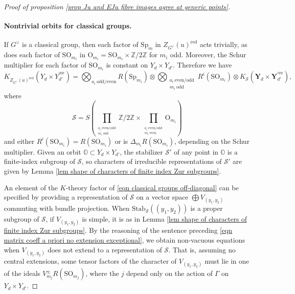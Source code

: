\documentclass[10pt]{article}
\newcommand{\stab}[2]{\mathrm{Stab}_{#1}(#2)}
\newcommand{\opp}{^\mathrm{opp}}
\newcommand{\Z}{\mathbb{Z}}
\newcommand{\SO}{\mathrm{SO}}
\newcommand{\Sp}{\mathrm{Sp}}
\newcommand{\OO}{\mathrm{O}}
\theoremstyle{definition}
\theoremstyle{remark}
\newcommand{\Zur}{Z_{G^\vee}(u)^{\mathrm{red}}}
\newcommand{\oO}{\mathbb{O}}
\begin{document}
\begin{proof}[Proof of proposition \ref{prop Ju and EJu fibre images agree at generic points}]
\paragraph{Nontrivial orbits for classical groups.}
If $G^\vee$ is a classical group,
then each factor of $\Sp_m$ in $\Zur$ acts trivially,
as does each factor of $\SO_{m_i}$ in $\OO_{m_i}=\SO_{m_i}\times\Z/2\Z$ for $m_i$ odd. Moreover, the Schur
multiplier for each factor of $\SO_{m_i}$ is constant on $Y_d\times Y_{d'}$. Therefore we have
%
\begin{equation}
\label{eqn classical groups off-diagonal}
K_{\Zur}(Y_d\times Y_{d'}^{\opp})=
\bigotimes_{a_i~\text{odd/even}}R(\Sp_{m_i})\otimes\bigotimes_{\substack{a_i~\text{even/odd} \\ m_i~\text{odd}}}R^i(\SO_{m_i})\otimes
K_{\mathcal{S}}(\mathbf{Y}_d\times \mathbf{Y}_{d'}^{\opp}),
\end{equation}
%
where 
%
\[\mathcal{S}=S\left(\prod_{_{\substack{a_i~\text{even/odd} \\ m_i~\text{odd}}}}\Z/2\Z\times\prod_{_{\substack{a_i~\text{even/odd} \\ m_i~\text{even}}}}\OO_{m_i}\right)
\]
%
and either $R^i(\SO_{m_i})=R(\SO_{m_i})$ or is $\Delta_{m_i}R(\SO_{m_i})$, depending on the Schur multiplier.
Given an orbit $\oO\subset Y_d\times Y_{d'}$, the stabilizer $\mathcal{S}'$ of any point in $\oO$ is a 
finite-index subgroup of $\mathcal{S}$, so characters of irreducible representations of $\mathcal{S}'$ are 
given by Lemma \ref{lem shape of characters of finite index Zur subgroups}.

An element of the $K$-theory factor of \eqref{eqn classical groups off-diagonal} can be specified by
providing a representation of $\mathcal{S}$ on a vector space $\bigoplus V_{(y_1,y_2)}$
commuting with bundle projection. When $\stab{\mathcal{S}}{(y_1,y_2)}$ is a proper subgroup of 
$\mathcal{S}$, if $V_{(y_1,y_2)}$ is simple, it is as in Lemma 
\ref{lem shape of characters of finite index Zur subgroups}. By the reasoning of the sentence preceding \eqref{eqn matrix coeff a priori no extension exceptional}, we obtain non-vacuous equations when $V_{(y_1,y_2)}$ does not 
extend to a representation of $\mathcal{S}$.
That is, assuming no central extensions, some tensor factors of 
the character of $V_{(y_1,y_2)}$ must lie in one of the ideals $V_{m_j}^{\pm}R(\SO_{m_j})$, where the 
$j$ depend only on the action of $\Gamma$ on $Y_d\times Y_{d'}$. 


\end{proof}
\end{document}
